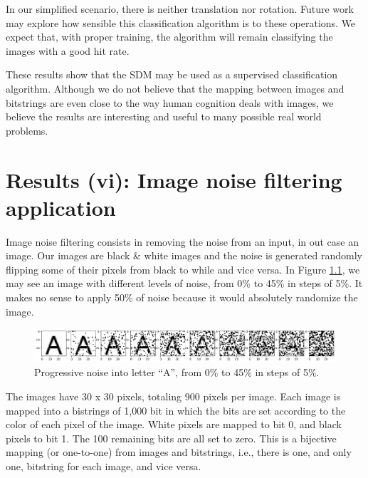 In our simplified scenario, there is neither translation nor rotation. Future work may explore how sensible this classification algorithm is to these operations. We expect that, with proper training, the algorithm will remain classifying the images with a good hit rate.

These results show that the SDM may be used as a supervised classification algorithm. Although we do not believe that the mapping between images and bitstrings are even close to the way human cognition deals with images, we believe the results are interesting and useful to many possible real world problems.













\chapter{Results (vi): Image noise filtering application}

\lstset{
    language=Python,
    basicstyle=\small\ttfamily,
}

Image noise filtering consists in removing the noise from an input, in out case an image. Our images are black \& white images and the noise is generated randomly flipping some of their pixels from black to while and vice versa. In Figure \ref{fig-filter-progressive-noise}, we may see an image with different levels of noise, from 0\% to 45\% in steps of 5\%. It makes no sense to apply 50\% of noise because it would absolutely randomize the image.

\begin{figure}[!htb]
\centering\includegraphics[width=\textwidth]{./images02/filter/progressive-noise.png}
\caption{Progressive noise into letter ``A'', from 0\% to 45\% in steps of 5\%.
\label{fig-filter-progressive-noise}}
\end{figure}

The images have 30 x 30 pixels, totaling 900 pixels per image. Each image is mapped into a bistrings of 1,000 bit in which the bits are set according to the color of each pixel of the image. White pixels are mapped to bit 0, and black pixels to bit 1. The 100 remaining bits are all set to zero. This is a bijective mapping (or one-to-one) from images and bitstrings, i.e., there is one, and only one, bitstring for each image, and vice versa.

